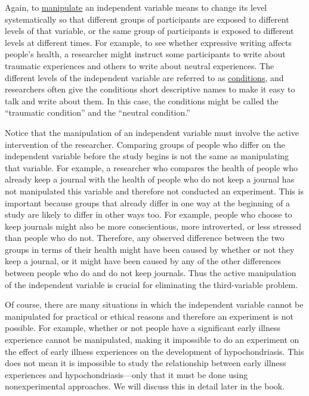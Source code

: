 \documentclass[
]{krantz}
\begin{document}
Again, to \protect\hyperlink{manipulate}{manipulate} an independent variable means to change its level systematically so that different groups of participants are exposed to different levels of that variable, or the same group of participants is exposed to different levels at different times. For example, to see whether expressive writing affects people's health, a researcher might instruct some participants to write about traumatic experiences and others to write about neutral experiences. The different levels of the independent variable are referred to as \protect\hyperlink{condition}{conditions}, and researchers often give the conditions short descriptive names to make it easy to talk and write about them. In this case, the conditions might be called the ``traumatic condition'' and the ``neutral condition.''

Notice that the manipulation of an independent variable must involve the active intervention of the researcher. Comparing groups of people who differ on the independent variable before the study begins is not the same as manipulating that variable. For example, a researcher who compares the health of people who already keep a journal with the health of people who do not keep a journal has not manipulated this variable and therefore not conducted an experiment. This is important because groups that already differ in one way at the beginning of a study are likely to differ in other ways too. For example, people who choose to keep journals might also be more conscientious, more introverted, or less stressed than people who do not. Therefore, any observed difference between the two groups in terms of their health might have been caused by whether or not they keep a journal, or it might have been caused by any of the other differences between people who do and do not keep journals. Thus the active manipulation of the independent variable is crucial for eliminating the third-variable problem.

Of course, there are many situations in which the independent variable cannot be manipulated for practical or ethical reasons and therefore an experiment is not possible. For example, whether or not people have a significant early illness experience cannot be manipulated, making it impossible to do an experiment on the effect of early illness experiences on the development of hypochondriasis. This does not mean it is impossible to study the relationship between early illness experiences and hypochondriasis---only that it must be done using nonexperimental approaches. We will discuss this in detail later in the book.
\end{document}
